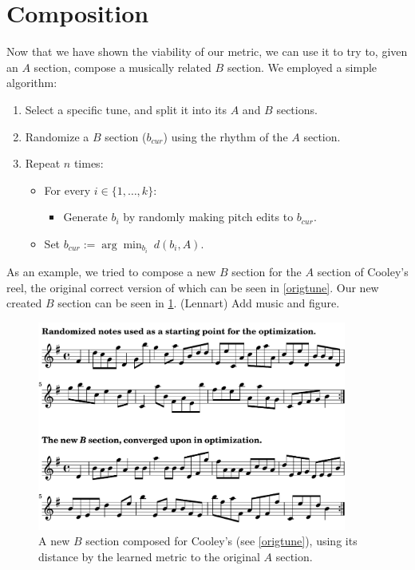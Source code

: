 \documentclass{article} %
\begin{document}
\section{Composition}
Now that we have shown the viability of our metric, we can use it to try to,
given an $A$ section, compose a musically related $B$ section. We employed a
simple algorithm:
\begin{enumerate}
\item Select a specific tune, and split it into its $A$ and $B$ sections.

\item Randomize a $B$ section ($b_{cur}$) using the rhythm of the $A$ section.

\item Repeat $n$ times:
\begin{itemize}\parskip=0.05in
\item[] For every $i \in \{1, \dots, k\}$:
\begin{itemize}
\item[] Generate $b_i$ by randomly making pitch edits to $b_{cur}$.
\end{itemize}
\item[] Set
$\displaystyle{b_{cur} := \arg \min_{b_i} \  d(b_i, A)}$.
\end{itemize}
\end{enumerate}
As an example, we tried to compose a new $B$ section for the $A$ section of
Cooley's reel, the original correct version of which can be seen in
\cref{origtune}. Our new created $B$ section can be seen in \cref{newb}. %
(Lennart) Add music and figure.
\begin{figure}
  \centering
  \includegraphics[width=4in]{new_b-crop.pdf}
  \caption{
    A new $B$ section composed for Cooley's (see \cref{origtune}), using its distance
    by the learned metric to the original $A$ section.
  }
  \label{newb}
\end{figure}
\end{document}
